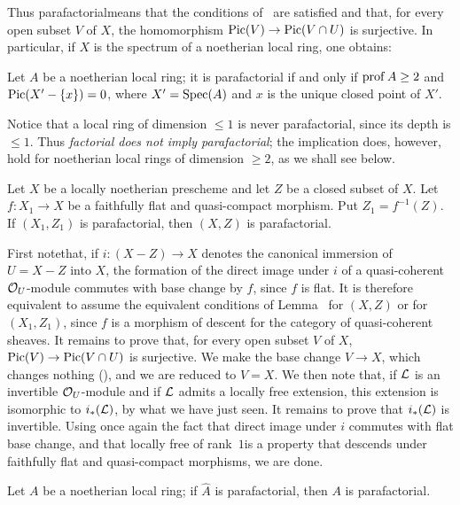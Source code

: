 Thus \og parafactorial\fg means that the conditions of~ are satisfied and that, for every open subset $V$ of $X$, the homomorphism $\operatorname{Pic}(V)\to\operatorname{Pic}(V\cap U)$ is surjective. In particular, if $X$ is the spectrum of a noetherian local ring, one obtains:

\begin{proposition} \label{XI.3.5}
Let $A$ be a noetherian local ring; it is parafactorial if and only if $\operatorname{prof} A\geq 2$ and $\operatorname{Pic}(X'-\{x\})=0$, where $X'=\operatorname{Spec}(A)$ and $x$ is the unique closed point of $X'$.
\end{proposition}

Notice that a local ring of dimension $\leq 1$ is never parafactorial, since its depth is $\leq 1$. Thus \emph{factorial does not imply parafactorial}; the implication does, however, hold for noetherian local rings of dimension $\geq 2$, as we shall see below.

\begin{lemme} \label{XI.3.6} Let $X$ be a locally noetherian prescheme and let $Z$ be a closed subset of $X$. Let $f\colon X_1\to X$ be a faithfully flat and quasi-compact morphism. Put $Z_1=f^{-1}(Z)$. If $(X_1, Z_1)$ is parafactorial, then $(X, Z)$ is parafactorial.
\end{lemme}

First note\pageoriginale that, if $i\colon(X-Z)\to X$ denotes the canonical immersion of $U=X-Z$ into $X$, the formation of the direct image under $i$ of a quasi-coherent $\mathcal O_U$-module commutes with base change by $f$, since $f$ is flat. It is therefore equivalent to assume the equivalent conditions of Lemma~ for $(X, Z)$ or for $(X_1, Z_1)$, since $f$ is a morphism of descent for the category of quasi-coherent sheaves. It remains to prove that, for every open subset $V$ of $X$, $\operatorname{Pic}(V)\to\operatorname{Pic}(V\cap U)$ is surjective. We make the base change $V\to X$, which changes nothing (), and we are reduced to $V=X$. We then note that, if ${\mathcal L}$ is an invertible $\mathcal O_U$-module and if ${\mathcal L}$ admits a locally free extension, this extension is isomorphic to $i_*({\mathcal L})$, by what we have just seen. It remains to prove that $i_*({\mathcal L})$ is invertible. Using once again the fact that direct image under $i$ commutes with flat base change, and that \og locally free of rank~$1$\fg is a property that descends under faithfully flat and quasi-compact morphisms, we are done.

\begin{corollaire} \label{XI.3.7} Let $A$ be a noetherian local ring; if $\hat A$ is parafactorial, then $A$ is parafactorial.
\end{corollaire}

